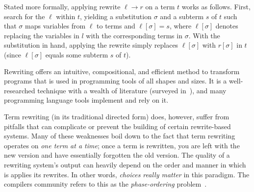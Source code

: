 Stated more formally,
 applying rewrite $\ell \to r$ on a term $t$
 works as follows.
First, search for the $\ell$ within $t$,
 yielding a substitution $\sigma$ and a subterm $s$ of $t$
 such that $\sigma$ maps variables from $\ell$ to terms
 and $\ell[\sigma] = s$,
 where $\ell[\sigma]$ denotes replacing the variables in $l$
 with the corresponding terms in $\sigma$.
With the substitution in hand,
 applying the rewrite simply replaces
 $\ell[\sigma]$ with $r[\sigma]$ in $t$
 (since $\ell[\sigma]$ equals some subterm $s$ of $t$).

Rewriting offers an
 intuitive, compositional, and efficient
 method to transform programs
 that is used in programming tools of all shapes and sizes.
It is a well-researched technique with a wealth of literature
 (surveyed in~\cite{nachum-rewrites, rewritesystems}),
 and many programming language tools implement and rely on it.

Term rewriting (in its traditional directed form) does, however,
 suffer from pitfalls that can complicate or prevent the building
 of certain rewrite-based systems.
Many of these weaknesses boil down to the fact that
 term rewriting operates on \emph{one term at a time};
 once a term is rewritten,
 you are left with the new version and have
 essentially forgotten the old version.
The quality of a rewriting system's output can heavily depend on
 the order and manner in which is applies its rewrites.
In other words, \emph{choices really matter} in this paradigm.
The compilers community refers to this as the
 \textit{phase-ordering} problem~\cite{phase-ordering,eqsat}.

